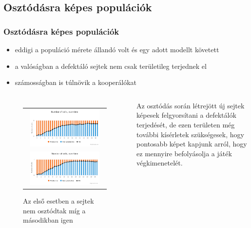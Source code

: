 \subsection{Osztódásra képes populációk}
\begin{frame}
\frametitle{Osztódásra képes populációk}
\begin{itemize}
	\item eddigi a populáció mérete állandó volt és egy adott modellt követett
	\item a valóságban a defektáló sejtek nem csak területileg terjednek el
	\item számosságban is túlnövik a kooperálókat
\end{itemize}

\begin{columns}
		\begin{figure}[ht]
			\centering
			\begin{tabular}{c}
				\includegraphics[width=0.9\textwidth]{images/nemosztodik}
				\\
				\includegraphics[width=0.9\textwidth]{images/osztodik}
			\end{tabular}
			\caption{Az első esetben a sejtek nem osztódtak míg a másodikban igen}				\label{fig:Divide}
		\end{figure}
		\begin{block}{}
			Az osztódás során létrejött új sejtek képesek felgyorsítani a defektálók terjedését, de ezen területen még további kísérletek szükségesek, hogy pontosabb képet kapjunk arról, hogy ez mennyire befolyásolja a játék végkimenetelét.
		\end{block}
\end{columns}
\end{frame}

